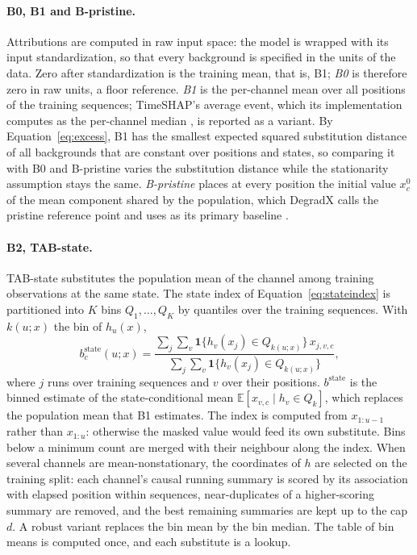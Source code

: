 \documentclass{article}
\begin{document}
\paragraph{B0, B1 and B-pristine.} Attributions are computed in raw input space: the model is wrapped with its input standardization, so that every background is specified in the units of the data. Zero after standardization is the training mean, that is, B1; \emph{B0} is therefore zero in raw units, a floor reference. \emph{B1} is the per-channel mean over all positions of the training sequences; TimeSHAP's average event, which its implementation computes as the per-channel median \citep{bento2021timeshap}, is reported as a variant.
By Equation~\eqref{eq:excess}, B1 has the smallest expected squared substitution distance of all backgrounds that are constant over positions and states, so comparing it with B0 and B-pristine varies the substitution distance while the stationarity assumption stays the same. \emph{B-pristine} places at every position the initial value $x^0_c$ of the mean component shared by the population, which DegradX calls the pristine reference point and uses as its primary baseline \citep{degradx2026}.

\paragraph{B2, TAB-state.} TAB-state substitutes the population mean of the channel among training observations at the same state. The state index of Equation~\eqref{eq:stateindex} is partitioned into $K$ bins $Q_1,\dots,Q_K$ by quantiles over the training sequences. With $k(u;x)$ the bin of $h_u(x)$,
\begin{equation}\label{eq:tabstate}
b^{\mathrm{state}}_c(u;x) = \frac{\sum_{j}\sum_{v}\mathbf{1}\{h_v(x_j)\in Q_{k(u;x)}\}\,x_{j,v,c}}{\sum_{j}\sum_{v}\mathbf{1}\{h_v(x_j)\in Q_{k(u;x)}\}},
\end{equation}
where $j$ runs over training sequences and $v$ over their positions. $b^{\mathrm{state}}$ is the binned estimate of the state-conditional mean $\mathbb{E}[x_{v,c}\mid h_v\in Q_k]$, which replaces the population mean that B1 estimates. The index is computed from $x_{1:u-1}$ rather than $x_{1:u}$: otherwise the masked value would feed its own substitute. Bins below a minimum count are merged with their neighbour along the index. When several channels are mean-nonstationary, the coordinates of $h$ are selected on the training split: each channel's causal running summary is scored by its association with elapsed position within sequences, near-duplicates of a higher-scoring summary are removed, and the best remaining summaries are kept up to the cap $d$. A robust variant replaces the bin mean by the bin median. The table of bin means is computed once, and each substitute is a lookup.
\end{document}
